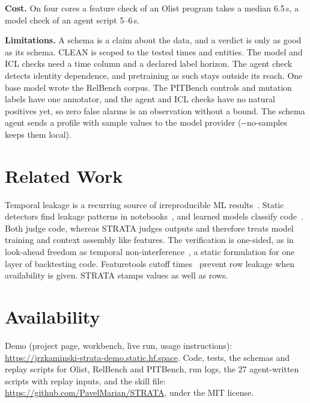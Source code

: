 \documentclass[10pt,conference]{IEEEtran}
\newcommand{\tool}{STRATA}
\begin{document}
\textbf{Cost.} On four cores a feature check of an Olist program takes a
median 6.5\,s, a model check of an agent script 5--6\,s.

\textbf{Limitations.} A schema is a claim about the data, and a verdict is
only as good as its schema. CLEAN is scoped to the tested times and
entities. The model and ICL checks need a time column and a declared label
horizon. The agent check detects identity dependence, and pretraining as
such stays outside its reach. One base model wrote the RelBench corpus. The
PITBench controls and mutation labels have one annotator, and the agent and
ICL checks have no natural positives yet, so zero false alarms is an
observation without a bound. The schema agent sends a profile with sample
values to the model provider (-{}-no-samples keeps them local).

\section{Related Work}

Temporal leakage is a recurring source of irreproducible ML
results~\cite{kaufman2011,kapoor2023}. Static detectors find leakage
patterns in notebooks~\cite{yang2022}, and learned models classify
code~\cite{peerj2025}. Both judge code, whereas \tool{} judges outputs and
therefore treats model training and context assembly like features.
The verification is one-sided, as in look-ahead freedom as temporal
non-interference~\cite{fonseca2026}, a static formulation for one layer of
backtesting code. Featuretools cutoff times~\cite{dfs} prevent row leakage
when availability is given. \tool{} stamps values as well as rows.

\section{Availability}

Demo (project page, workbench, live run, usage instructions):
\url{https://jrzkaminski-strata-demo.static.hf.space}. Code, tests, the
schemas and replay scripts for Olist, RelBench and PITBench, run logs, the
27 agent-written scripts with replay inputs, and the skill file:
\url{https://github.com/PavelMarian/STRATA}, under the MIT license.



\end{document}
